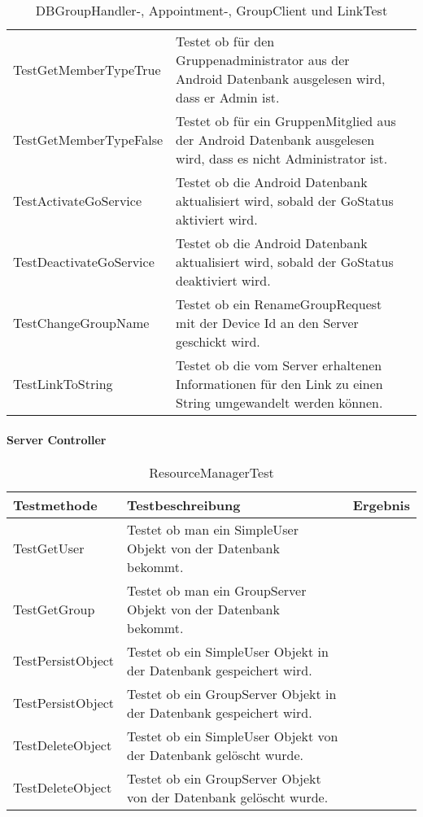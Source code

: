 \begin{table}[H]
{\begin{tabular}{|p{}|p{}|>{\centering}p{}|}
				\hspace{0pt}TestGetMemberTypeTrue & Testet ob für den Gruppenadministrator aus der Android Datenbank ausgelesen wird, dass er Admin ist. & \checkmark\tabularnewline
				\hspace{0pt}TestGetMemberTypeFalse & Testet ob für ein GruppenMitglied aus der Android Datenbank ausgelesen wird, dass es nicht Administrator ist. & \checkmark\tabularnewline
				\hspace{0pt}TestActivateGoService & Testet ob die Android Datenbank aktualisiert wird, sobald der GoStatus aktiviert wird. & \checkmark\tabularnewline
				\hspace{0pt}TestDeactivateGoService & Testet ob die Android Datenbank aktualisiert wird, sobald der GoStatus deaktiviert wird. & \checkmark\tabularnewline
				\hspace{0pt}TestChangeGroupName & Testet ob ein RenameGroupRequest mit der Device Id an den Server geschickt wird. & \checkmark\tabularnewline
				\hspace{0pt}TestLinkToString & Testet ob die vom Server erhaltenen Informationen für den Link zu einen String umgewandelt werden können. & \checkmark\tabularnewline
				\hline
			\end{tabular}}
			\caption{DBGroupHandler-, Appointment-, GroupClient und LinkTest}
		\end{table}



		\paragraph{Server Controller}
		\begin{table}[H]
			{
				\begin{tabular}{|p{}|p{}|>{\centering}p{}|}
					\hline
					Testmethode & Testbeschreibung & Ergebnis\tabularnewline
					\hline
					\hspace{0pt}TestGetUser & Testet ob man ein SimpleUser Objekt von der Datenbank bekommt. &	\checkmark\tabularnewline
					\hspace{0pt}TestGetGroup & Testet ob man ein GroupServer Objekt von der Datenbank bekommt. &	\checkmark\tabularnewline
					\hspace{0pt}TestPersistObject & Testet ob ein SimpleUser Objekt in der Datenbank gespeichert wird. &	\checkmark\tabularnewline
					\hspace{0pt}TestPersistObject & Testet ob ein GroupServer Objekt in der Datenbank gespeichert wird. &	\checkmark\tabularnewline
					\hspace{0pt}TestDeleteObject & Testet ob ein SimpleUser Objekt von der Datenbank gelöscht wurde. &	\checkmark\tabularnewline
					\hspace{0pt}TestDeleteObject & Testet ob ein GroupServer Objekt von der Datenbank gelöscht wurde. &	\checkmark\tabularnewline
					\hline
				\end{tabular}}
				\caption{ResourceManagerTest}
			\end{table}

